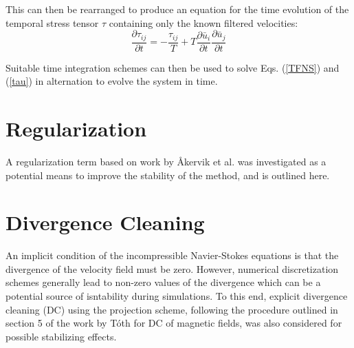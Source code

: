 This can then be rearranged to produce an equation for the time evolution of the temporal stress tensor $\tau$ containing only the known filtered velocities:
\begin{equation} \label{tau}
\frac{\partial \tau_{ij}}{\partial t}=-\frac{\tau_{ij}}{T}+T\frac{\partial \bar{u}_i}{\partial t}\frac{\partial \bar{u}_j}{\partial t}
\end{equation}

Suitable time integration schemes can then be used to solve Eqs. (\ref{TFNS}) and (\ref{tau}) in alternation to evolve the system in time.

\section{Regularization}

A regularization term based on work by \AA kervik et al. \cite{Akervik2006} was investigated as a potential means to improve the stability of the method, and is outlined here.

\section{Divergence Cleaning}

An implicit condition of the incompressible Navier-Stokes equations is that the divergence of the velocity field must be zero. However, numerical discretization schemes generally lead to non-zero values of the divergence which can be a potential source of isntability during simulations. To this end, explicit divergence cleaning (DC) using the projection scheme, following the procedure outlined in section 5 of the work by T\'oth \cite{Toth2000} for DC of magnetic fields, was also considered for possible stabilizing effects.